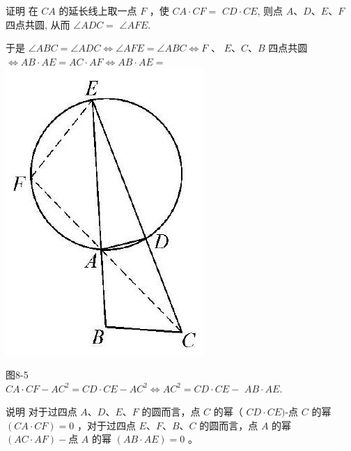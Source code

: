 \documentclass[10pt]{article}
\begin{document}
证明 在 $C A$ 的延长线上取一点 $F$ ，使 $C A \cdot C F=$ $C D \cdot C E$, 则点 $A 、 D 、 E 、 F$ 四点共圆, 从而 $\angle A D C=$ $\angle A F E$.

于是 $\angle A B C=\angle A D C \Leftrightarrow \angle A F E=\angle A B C \Leftrightarrow F$ 、 $E 、 C 、 B$ 四点共圆 $\Leftrightarrow A B \cdot A E=A C \cdot A F \Leftrightarrow A B \cdot A E=$\\
\includegraphics[max width=\textwidth, center]{2024_10_30_66b8e5e701da2093c133g-059}

图8-5\\
$C A \cdot C F-A C^{2}=C D \cdot C E-A C^{2} \Leftrightarrow A C^{2}=C D \cdot C E-$ $A B \cdot A E$.

说明 对于过四点 $A 、 D 、 E 、 F$ 的圆而言，点 $C$ 的幂（ $C D \cdot C E)$-点 $C$ 的幂 $(C A \cdot C F)=0$ ，对于过四点 $E 、 F 、 B 、 C$ 的圆而言，点 $A$ 的幂 $(A C \cdot A F)-$点 $A$ 的幂 $(A B \cdot A E)=0$ 。
\end{document}
